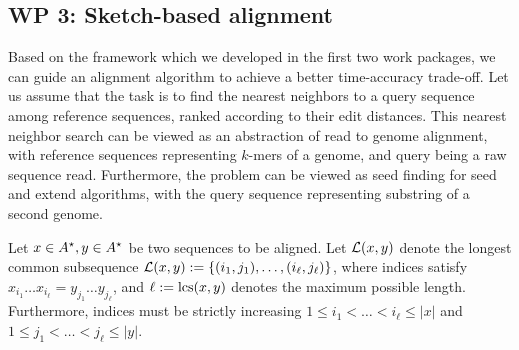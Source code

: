 \subsection{WP 3: Sketch-based alignment}
Based on the framework which we developed in the first two work packages, we can guide an alignment algorithm to achieve a better time-accuracy trade-off. Let us assume that the task is to find the nearest neighbors to a query sequence among reference sequences, ranked according to their edit distances. This nearest neighbor search can be viewed as an abstraction of read to genome alignment, with reference sequences representing $k$-mers of a genome, and query being a raw sequence read. Furthermore, the problem can be viewed as seed finding for seed and extend algorithms, with the query sequence representing substring of a second genome. 


Let $x \in A^\star, y\in A^\star$ be two sequences to be aligned. Let $\mathcal{L}(x,y)$ denote the longest common subsequence $\mathcal{L}(x,y):=\left\{(i_1,j_1),\dots,(i_\ell,j_\ell)\right\}$, where indices satisfy $x_{i_1}\dots x_{i_\ell} =y_{j_1}\dots y_{j_\ell}$, and $\ell:=\operatorname{\mathrm{lcs}}(x,y)$ denotes the maximum possible length. Furthermore, indices must be strictly increasing $1\le i_1<\dots<i_\ell\le |x|$ and $1\le j_1<\dots<j_\ell\le |y|$. 

